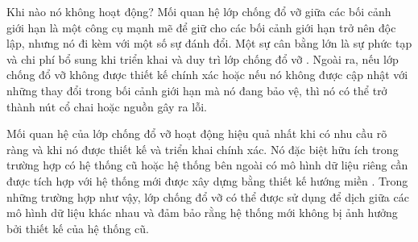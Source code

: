 Khi nào nó không hoạt động?
Mối quan hệ lớp chống đổ vỡ giữa các bối cảnh giới hạn là một công cụ mạnh mẽ để giữ cho các bối cảnh giới hạn trở nên độc lập, nhưng nó đi kèm với một số sự đánh đổi. Một sự cân bằng lớn là sự phức tạp và chi phí bổ sung khi triển khai và duy trì lớp chống đổ vỡ . Ngoài ra, nếu lớp chống đổ vỡ không được thiết kế chính xác hoặc nếu nó không được cập nhật với những thay đổi trong bối cảnh giới hạn mà nó đang bảo vệ, thì nó có thể trở thành nút cổ chai hoặc nguồn gây ra lỗi.

Mối quan hệ của lớp chống đổ vỡ hoạt động hiệu quả nhất khi có nhu cầu rõ ràng và khi nó được thiết kế và triển khai chính xác. Nó đặc biệt hữu ích trong trường hợp có hệ thống cũ hoặc hệ thống bên ngoài có mô hình dữ liệu riêng cần được tích hợp với hệ thống mới được xây dựng bằng thiết kế hướng miền . Trong những trường hợp như vậy, lớp chống đổ vỡ có thể được sử dụng để dịch giữa các mô hình dữ liệu khác nhau và đảm bảo rằng hệ thống mới không bị ảnh hưởng bởi thiết kế của hệ thống cũ.


